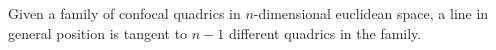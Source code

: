 Given a family of confocal quadrics in $n$-dimensional euclidean space, a line in general position is tangent to $n-1$ different quadrics in the family.
